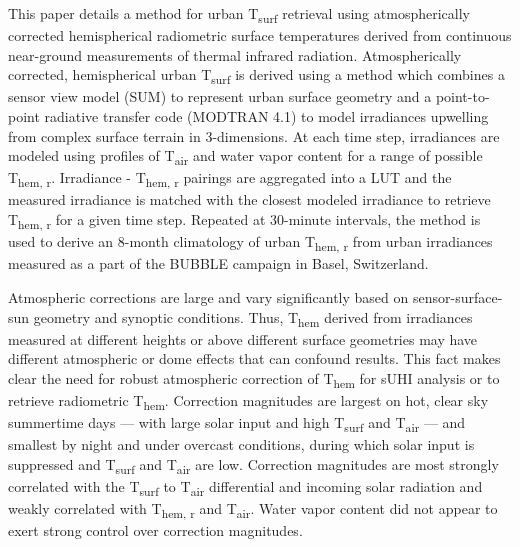 \begin{bibunit}
This paper details a method for urban T\textsubscript{surf} retrieval using atmospherically corrected hemispherical radiometric surface temperatures derived from continuous near-ground measurements of thermal infrared radiation. Atmospherically corrected, hemispherical urban T\textsubscript{surf} is derived using a method which combines a sensor view model (SUM) to represent urban surface geometry and a point-to-point radiative transfer code (MODTRAN 4.1) to model irradiances upwelling from complex surface terrain in 3-dimensions. At each time step, irradiances are modeled using profiles of T\textsubscript{air} and water vapor content for a range of possible T\textsubscript{hem, r}. Irradiance - T\textsubscript{hem, r} pairings are aggregated into a LUT and the measured irradiance is matched with the closest modeled irradiance to retrieve T\textsubscript{hem, r} for a given time step. Repeated at 30-minute intervals, the method is used to derive an 8-month climatology of urban T\textsubscript{hem, r} from urban irradiances measured as a part of the BUBBLE campaign in Basel, Switzerland.
 
Atmospheric corrections are large and vary significantly based on sensor-surface-sun geometry and synoptic conditions. Thus, T\textsubscript{hem} derived from irradiances measured at different heights or above different surface geometries may have different atmospheric or dome effects that can confound results. This fact makes clear the need for robust atmospheric correction of T\textsubscript{hem} for sUHI analysis or to retrieve radiometric T\textsubscript{hem}. Correction magnitudes are largest on hot, clear sky summertime days --- with large solar input and high T\textsubscript{surf} and T\textsubscript{air} --- and smallest by night and under overcast conditions, during which solar input is suppressed and T\textsubscript{surf} and T\textsubscript{air} are low. Correction magnitudes are most strongly correlated with the T\textsubscript{surf} to T\textsubscript{air} differential and incoming solar radiation and weakly correlated with T\textsubscript{hem, r} and T\textsubscript{air}. Water vapor content did not appear to exert strong control over correction magnitudes.


\end{bibunit}
